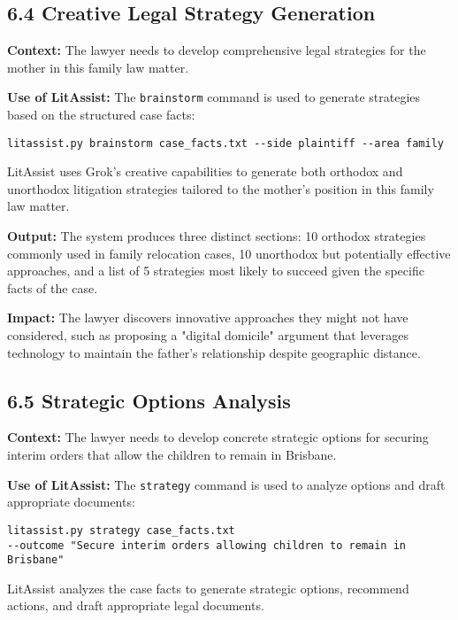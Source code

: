 \documentclass[12pt,a4paper]{article}
\begin{document}
\subsection*{6.4 Creative Legal Strategy Generation}

\textbf{Context:} The lawyer needs to develop comprehensive legal strategies for the mother in this family law matter.

\textbf{Use of LitAssist:} The \texttt{brainstorm} command is used to generate strategies based on the structured case facts:

\begin{verbatim}
litassist.py brainstorm case_facts.txt --side plaintiff --area family
\end{verbatim}

LitAssist uses Grok's creative capabilities to generate both orthodox and unorthodox litigation strategies tailored to the mother's position in this family law matter.

\textbf{Output:} The system produces three distinct sections: 10 orthodox strategies commonly used in family relocation cases, 10 unorthodox but potentially effective approaches, and a list of 5 strategies most likely to succeed given the specific facts of the case.

\textbf{Impact:} The lawyer discovers innovative approaches they might not have considered, such as proposing a "digital domicile" argument that leverages technology to maintain the father's relationship despite geographic distance.

\subsection*{6.5 Strategic Options Analysis}

\textbf{Context:} The lawyer needs to develop concrete strategic options for securing interim orders that allow the children to remain in Brisbane.

\textbf{Use of LitAssist:} The \texttt{strategy} command is used to analyze options and draft appropriate documents:

\begin{verbatim}
litassist.py strategy case_facts.txt 
--outcome "Secure interim orders allowing children to remain in Brisbane"
\end{verbatim}

LitAssist analyzes the case facts to generate strategic options, recommend actions, and draft appropriate legal documents.
\end{document}
